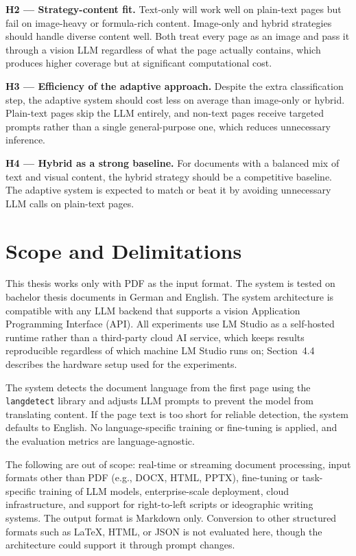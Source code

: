 \textbf{H2 --- Strategy-content fit.} Text-only will work well on plain-text
pages but fail on image-heavy or formula-rich content. Image-only and hybrid
strategies should handle diverse content well. Both treat every page as an
image and pass it through a vision LLM regardless of what the page actually
contains, which produces higher coverage but at significant computational cost.

\textbf{H3 --- Efficiency of the adaptive approach.} Despite the extra
classification step, the adaptive system should cost less on average than
image-only or hybrid. Plain-text pages skip the LLM entirely, and non-text
pages receive targeted prompts rather than a single general-purpose one,
which reduces unnecessary inference.

\textbf{H4 --- Hybrid as a strong baseline.} For documents with a balanced
mix of text and visual content, the hybrid strategy should be a competitive
baseline. The adaptive system is expected to match or beat it by avoiding
unnecessary LLM calls on plain-text pages.

\section{Scope and Delimitations}

This thesis works only with PDF as the input format. The system is tested
on bachelor thesis documents in German and English. The system
architecture is compatible with any LLM backend that supports a vision
Application Programming Interface (API). All experiments use LM Studio as
a self-hosted runtime rather than a third-party cloud AI service, which
keeps results reproducible regardless of which machine LM Studio runs on;
Section~4.4 describes the hardware setup used for the experiments.

The system detects the document language from the first page using the
\texttt{langdetect} library and adjusts LLM prompts to prevent the model
from translating content. If the page text is too short for reliable
detection, the system defaults to English. No language-specific training or
fine-tuning is applied, and the evaluation metrics are language-agnostic.

The following are out of scope: real-time or streaming document processing,
input formats other than PDF (e.g., DOCX, HTML, PPTX), fine-tuning or
task-specific training of LLM models, enterprise-scale deployment, cloud
infrastructure, and support for right-to-left scripts or ideographic writing
systems. The output format is Markdown only. Conversion to other structured
formats such as LaTeX, HTML, or JSON is not evaluated here, though the
architecture could support it through prompt changes.

